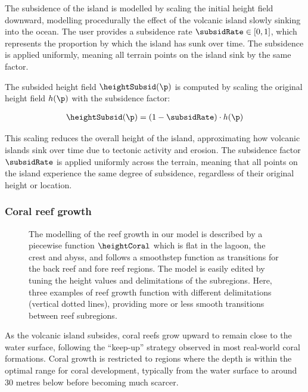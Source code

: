 The subsidence of the island is modelled by scaling the initial height field downward, modelling procedurally the effect of the volcanic island slowly sinking into the ocean. The user provides a subsidence rate $\subsidRate \in [0, 1]$, which represents the proportion by which the island has sunk over time. The subsidence is applied uniformly, meaning all terrain points on the island sink by the same factor.

The subsided height field $\heightSubsid(\p)$ is computed by scaling the original height field $h(\p)$ with the subsidence factor:

\begin{align}
    \heightSubsid(\p) = (1 - \subsidRate) \cdot h(\p)
\end{align}

This scaling reduces the overall height of the island, approximating how volcanic islands sink over time due to tectonic activity and erosion. The subsidence factor $\subsidRate$ is applied uniformly across the terrain, meaning that all points on the island experience the same degree of subsidence, regardless of their original height or location.

\subsubsection{Coral reef growth}
\label{sec:coral-island-reef-growth}

\begin{figure}[H]
    \caption{The modelling of the reef growth in our model is described by a piecewise function $\heightCoral$ which is flat in the lagoon, the crest and abyss, and follows a smoothstep function as transitions for the back reef and fore reef regions. The model is easily edited by tuning the height values and delimitations of the subregions. Here, three examples of reef growth function with different delimitations (vertical dotted lines), providing more or less smooth transitions between reef subregions.}
    \label{fig:coral-island-reef-function}
\end{figure}

As the volcanic island subsides, coral reefs grow upward to remain close to the water surface, following the “keep-up” strategy observed in most real-world coral formations. Coral growth is restricted to regions where the depth is within the optimal range for coral development, typically from the water surface to around 30 metres below before becoming much scarcer.

